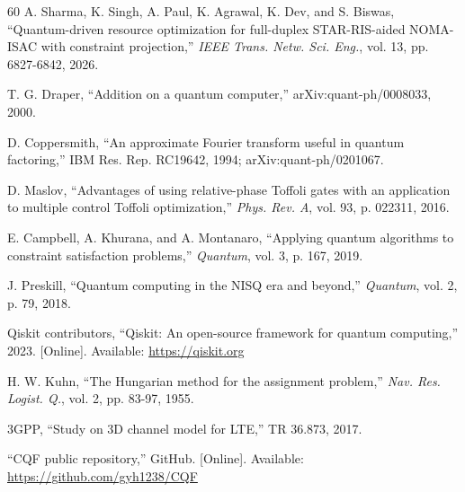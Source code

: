 \documentclass[journal]{IEEEtran}
\begin{document}
\begin{thebibliography}{60}
A. Sharma, K. Singh, A. Paul, K. Agrawal, K. Dev, and S. Biswas,
``Quantum-driven resource optimization for full-duplex
STAR-RIS-aided NOMA-ISAC with constraint projection,''
\emph{IEEE Trans. Netw. Sci. Eng.}, vol. 13, pp. 6827-6842, 2026.

T. G. Draper, ``Addition on a quantum computer,''
arXiv:quant-ph/0008033, 2000.

D. Coppersmith, ``An approximate Fourier transform useful in quantum
factoring,'' IBM Res. Rep. RC19642, 1994; arXiv:quant-ph/0201067.

D. Maslov, ``Advantages of using relative-phase Toffoli gates with
an application to multiple control Toffoli optimization,''
\emph{Phys. Rev. A}, vol. 93, p. 022311, 2016.

E. Campbell, A. Khurana, and A. Montanaro, ``Applying quantum
algorithms to constraint satisfaction problems,'' \emph{Quantum},
vol. 3, p. 167, 2019.

J. Preskill, ``Quantum computing in the NISQ era and beyond,''
\emph{Quantum}, vol. 2, p. 79, 2018.

Qiskit contributors, ``Qiskit: An open-source framework for quantum
computing,'' 2023. [Online]. Available: \url{https://qiskit.org}

H. W. Kuhn, ``The Hungarian method for the assignment problem,''
\emph{Nav. Res. Logist. Q.}, vol. 2, pp. 83-97, 1955.

3GPP, ``Study on 3D channel model for LTE,'' TR 36.873, 2017.


``CQF public repository,'' GitHub. [Online]. Available:
\url{https://github.com/gyh1238/CQF}


\end{thebibliography}
\end{document}

